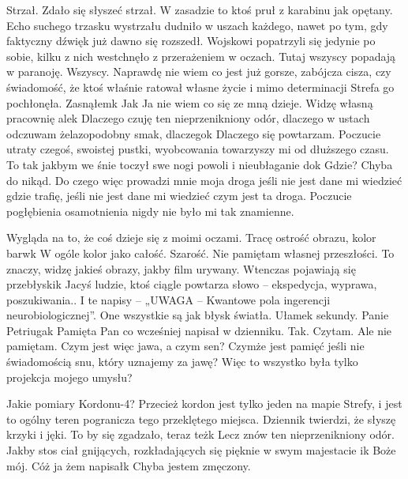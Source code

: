 \documentclass[../MAIN.tex]{subfiles}
\begin{document}
Strzał. Zdało się słyszeć strzał. W zasadzie to ktoś pruł z karabinu jak opętany. Echo suchego trzasku wystrzału dudniło w uszach każdego, nawet po tym, gdy faktyczny dźwięk już dawno się rozszedł. Wojskowi popatrzyli się jedynie po sobie, kilku z nich westchnęło z przerażeniem w oczach. Tutaj wszyscy popadają w paranoję. Wszyscy. Naprawdę nie wiem co jest już gorsze, zabójcza cisza, czy świadomość, że ktoś właśnie ratował własne życie i mimo determinacji Strefa go pochłonęła.
Zasnąłem\3k
% 
% 
Ja\3k Ja nie wiem co się ze mną dzieje. Widzę własną pracownię ale\3k Dlaczego czuję ten nieprzenikniony odór, dlaczego w ustach odczuwam żelazopodobny smak, dlaczego\3k Dlaczego się powtarzam. Poczucie utraty czegoś, swoistej pustki, wyobcowania towarzyszy mi od dłuższego czasu. To tak jakbym we śnie toczył swe nogi powoli i nieubłaganie do\3k Gdzie? Chyba do nikąd. Do czego więc prowadzi mnie moja droga jeśli nie jest dane mi wiedzieć gdzie trafię, jeśli nie jest dane mi wiedzieć czym jest ta droga. Poczucie pogłębienia osamotnienia nigdy nie było mi tak znamienne.

Wygląda na to, że coś dzieje się z moimi oczami. Tracę ostrość obrazu, kolor barw\3k W ogóle kolor jako całość. Szarość. Nie pamiętam własnej przeszłości. To znaczy, widzę jakieś obrazy, jakby film urywany. Wtenczas pojawiają się przebłyski\3k Jacyś ludzie, ktoś ciągle powtarza słowo -- ekspedycja, wyprawa, poszukiwania.. I te napisy -- „UWAGA -- Kwantowe pola ingerencji neurobiologicznej”. One wszystkie są jak błysk światła. Ułamek sekundy. Panie Petriuga\3k Pamięta Pan co wcześniej napisał w dzienniku. Tak. Czytam. Ale nie pamiętam. Czym jest więc jawa, a czym sen? Czymże jest pamięć jeśli nie świadomością snu, który uznajemy za jawę? Więc to wszystko była tylko projekcja mojego umysłu?

Jakie pomiary Kordonu-4? Przecież kordon jest tylko jeden na mapie Strefy, i jest to ogólny teren pogranicza tego przeklętego miejsca. Dziennik twierdzi, że słyszę krzyki i jęki. To by się zgadzało, teraz też\3k Lecz znów ten nieprzenikniony odór. Jakby stos ciał gnijących, rozkładających się pięknie w swym majestacie i\3k Boże mój. Cóż ja żem napisał\3k Chyba jestem zmęczony.
\end{document}
